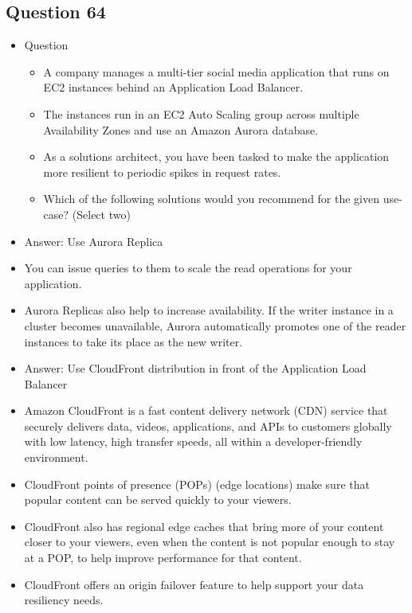 \documentclass[]{scrartcl}
\begin{document}
\subsection{Question 64}
\begin{itemize}
	\item Question
	\begin{itemize}
		\item A company manages a multi-tier social media application that runs on EC2 instances behind an Application Load Balancer. 
		\item The instances run in an EC2 Auto Scaling group across multiple Availability Zones and use an Amazon Aurora database. 
		\item As a solutions architect, you have been tasked to make the application more resilient to periodic spikes in request rates.
		\item Which of the following solutions would you recommend for the given use-case? (Select two)
	\end{itemize}
	\item Answer: Use Aurora Replica
	\item You can issue queries to them to scale the read operations for your application. 
	\item Aurora Replicas also help to increase availability. If the writer instance in a cluster becomes unavailable, Aurora automatically promotes one of the reader instances to take its place as the new writer.
	\item Answer: Use CloudFront distribution in front of the Application Load Balancer
	\item Amazon CloudFront is a fast content delivery network (CDN) service that securely delivers data, videos, applications, and APIs to customers globally with low latency, high transfer speeds, all within a developer-friendly environment.
	\item CloudFront points of presence (POPs) (edge locations) make sure that popular content can be served quickly to your viewers. 
	\item CloudFront also has regional edge caches that bring more of your content closer to your viewers, even when the content is not popular enough to stay at a POP, to help improve performance for that content.
	\item CloudFront offers an origin failover feature to help support your data resiliency needs. 
\end{itemize}
\end{document}
